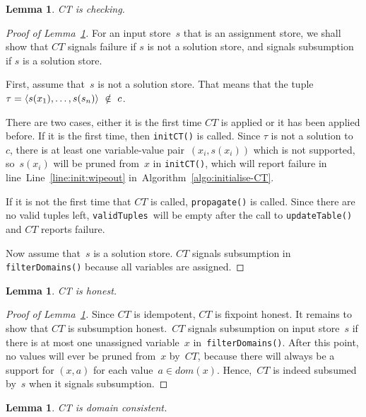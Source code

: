 \documentclass[a4paper,11pt]{article}
\newtheorem{lemma}[theorem]{Lemma}
\newcommand{\T}[1]{\texttt{#1}}
\newcommand{\Algoref}[1]{Algorithm~\ref{#1}}
\newcommand{\Lineref}[1]{Line~\ref{#1}}
\newcommand{\Lemmaref}[1]{Lemma~\ref{#1}}
\newcommand{\CurrTable}{\texttt{validTuples}}
\numberwithin{equation}{section}
\begin{document}
\begin{lemma}\label{lemma:checking}
  CT is checking.
\end{lemma}

\begin{proof}[Proof of \Lemmaref{lemma:checking}]
  For an input store~$s$ that is an assignment store, we shall show that $CT$
  signals failure if $s$ is not a solution store, and signals subsumption if
  $s$ is a solution store. 

  First, assume that~$s$ is not a solution store. That means that the tuple
  $\tau = \left\langle s(x_1),\ldots,s(s_n)\right\rangle~\notin~c$.
 
  There are two cases, either
  it is the first time $CT$ is applied or it has been applied before.
  If it is the first time, then \T{initCT()} is called.
  Since $\tau$ is not a solution to~$c$, there is at least one variable-value
  pair~$(x_i,s(x_i))$ which is not supported, so~$s(x_i)$ will be pruned
  from~$x$ in \T{initCT()}, which will report failure in line~\Lineref{line:init:wipeout}
  in~\Algoref{algo:initialise-CT}.
  
  If it is not the first time that $CT$ is called, \T{propagate()} is called.
  Since there are no valid tuples left, \CurrTable~will be empty after
  the call to \T{updateTable()} and $CT$ reports failure.
  
  Now assume that~$s$ is a solution store. 
  $CT$ signals subsumption in \T{filterDomains()} because all variables are assigned.

\end{proof}

\begin{lemma}\label{lemma:honest}
  CT is honest.
\end{lemma}

\begin{proof}[Proof of \Lemmaref{lemma:honest}]
  Since $CT$ is idempotent, $CT$ is fixpoint honest. It remains to show that
  $CT$ is subsumption honest.~$CT$ signals subsumption on input store~$s$
  if there is at most one
  unassigned variable~$x$ in~\T{filterDomains()}. After this point, no values will
  ever be pruned from~$x$ by~$CT$, because there will always be a support for
  $(x,a)$ for each value~$a \in dom(x)$. Hence,~$CT$ is indeed subsumed by~$s$
  when it signals subsumption.
    
\end{proof}

\begin{lemma}\label{lemma:domain-consistent}
  CT is domain consistent.
\end{lemma}
\end{document}
